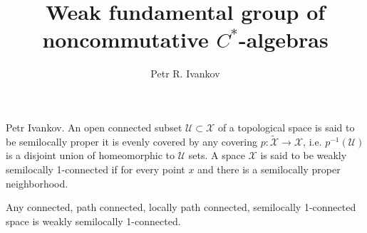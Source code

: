 \documentclass{beamer}
\title{Weak fundamental group of noncommutative $C^*$-algebras}
\institute
{
Algebras in analysis
}
\author{Petr R. Ivankov  }
\theoremstyle{plain}
\newcommand{\sU}{\mathcal{U}}       %
\newcommand{\sX}{\mathcal{X}}       %
\begin{document}
\begin{frame}
  \titlepage
\end{frame}
\begin{frame}
\begin{definition}\label{top_weakly_semi1_defn}\alert{Petr Ivankov.}
		An open connected subset $\sU\subset \sX$ of a topological space is said to be \alert{semilocally proper} it is evenly covered by any covering $p:\widetilde{\sX}\to\sX$, i.e. $p^{-1}\left(\sU \right)$ is a disjoint union of homeomorphic to $\sU$ sets. 
A space $\sX$ is said to be \alert{weakly semilocally 1-connected} if for  every point $x$ and there is a semilocally proper neighborhood.
\end{definition} 
\begin{example}
	Any connected, path connected, locally path connected, semilocally 1-connected   space is weakly semilocally 1-connected.
\end{example}

\end{frame}
\end{document}
